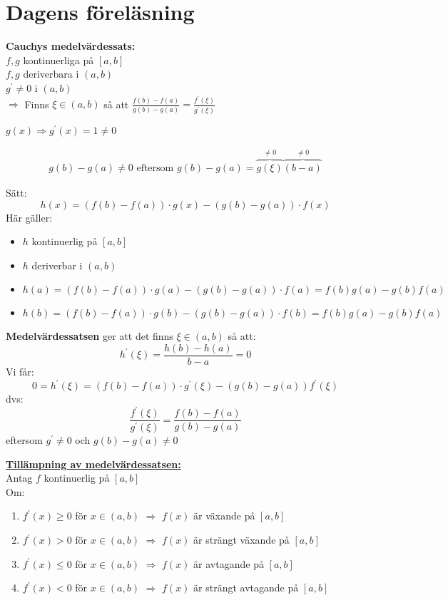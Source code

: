 \section{Dagens föreläsning} %
\label{sec:dagens_f_rel_sning}
\begin{sats}
    \textbf{Cauchys medelvärdessats:}\\
    $f, g$ kontinuerliga på $[a,b]$\\
    $f,g$ deriverbara  i $(a,b)$\\
    $g ^\prime \neq 0$ i $(a,b)$\\
    $\Rightarrow$ Finns $\xi \in (a,b)$ så att $\frac{f(b) - f(a)}{g(b)-g(a)} = \frac{f^\prime(\xi)}{g^\prime(\xi)}$
\end{sats}
\begin{Rem}
    $g(x) \Rightarrow g^\prime(x) = 1 \neq 0$
\end{Rem}
\begin{Rem}
    \begin{align*}
        g(b) - g(a) \neq 0 \mbox{ eftersom } g(b) - g(a) = \overbrace{g(\xi)}^{\neq 0}\overbrace{(b-a)}^{\neq 0}
    \end{align*}
\end{Rem}
\begin{bevis}
    Sätt:
    \[
    h(x) = (f(b) - f(a)) \cdot g(x) - (g(b) - g(a))\cdot f(x)
    \]
    Här gäller:
    \begin{itemize}
        \item $h$ kontinuerlig på $[a,b]$
        \item $h$ deriverbar i $(a,b)$
        \item $h(a) = (f(b) - f(a)) \cdot g(a) - (g(b) - g(a)) \cdot f(a) = f(b)g(a) - g(b)f(a)$
        \item $h(b) = (f(b) - f(a)) \cdot g(b) - (g(b) - g(a)) \cdot f(b) = f(b)g(a) - g(b)f(a)$
    \end{itemize}
    \textbf{Medelvärdessatsen} ger att det finns $\xi \in (a,b)$ så att:
    \[
    h^\prime(\xi) = \frac{h(b)- h(a)}{b-a} = 0
    \]
    Vi får:
    \[
    0 = h^\prime(\xi) = (f(b) - f(a))\cdot g^\prime(\xi) - (g(b)- g(a))f^\prime(\xi)
    \]
    dvs:
    \[
    \frac{f^\prime(\xi)}{g^\prime(\xi)} = \frac{f(b)- f(a)}{g(b)- g(a)}
    \]
    eftersom $g^\prime \neq 0$ och $g(b) - g(a) \neq 0$
\end{bevis}
\textbf{\underline{Tillämpning av medelvärdessatsen:}}\\
Antag $f$ kontinuerlig på $[a,b]$\\
Om:
\begin{enumerate}
    \item $f^\prime(x) \ge 0$ för $x \in (a,b)$ $\Rightarrow$ $f(x)$ är växande på $[a,b]$
    \item $f^\prime(x) > 0$ för $x \in (a,b)$ $\Rightarrow$ $f(x)$ är strängt växande på $[a,b]$
    \item $f^\prime(x) \le 0$ för $x \in (a,b)$ $\Rightarrow$ $f(x)$ är avtagande på $[a,b]$
    \item $f^\prime(x) < 0$ för $x \in (a,b)$ $\Rightarrow$ $f(x)$ är strängt avtagande på $[a,b]$
\end{enumerate}
